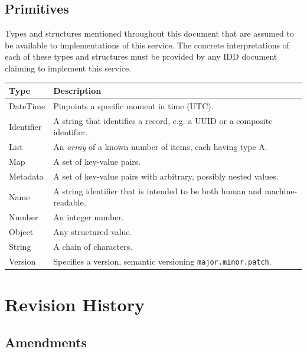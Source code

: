 \documentclass[a4paper]{arrowhead}
\newcommand{\pdef}[1]{{\textcolor{ArrowheadGrey}{#1\label{sec:model:primitives:#1}\label{sec:model:primitives:#1s}\label{sec:model:primitives:#1es}}}}
\begin{document}
\subsection{Primitives}
\label{sec:model:primitives}

Types and structures mentioned throughout this document that are assumed to be available to implementations of this service.
The concrete interpretations of each of these types and structures must be provided by any IDD document claiming to implement this service.

\noindent\begin{tabularx}{\textwidth}{| p{4.6cm} | X |} \hline
\rowcolor{gray!33} Type & Description \\ \hline
\pdef{DateTime} & Pinpoints a specific moment in time (UTC). \\ \hline
\pdef{Identifier} & A string that identifies a record, e.g. a UUID or a composite identifier. \\ \hline
\pdef{List} & An \textit{array} of a known number of items, each having type A. \\ \hline
\pdef{Map} & A set of key-value pairs. \\ \hline
\pdef{Metadata} & A set of key-value pairs with arbitrary, possibly nested values. \\ \hline
\pdef{Name} & A string identifier that is intended to be both human and machine-readable. \\ \hline
\pdef{Number} & An integer number. \\ \hline
\pdef{Object} & Any structured value. \\ \hline
\pdef{String} & A chain of characters. \\ \hline
\pdef{Version} & Specifies a version, semantic versioning \texttt{major.minor.patch}. \\ \hline
\end{tabularx}

\newpage




\newpage

\section{Revision History}
\subsection{Amendments}
\end{document}
